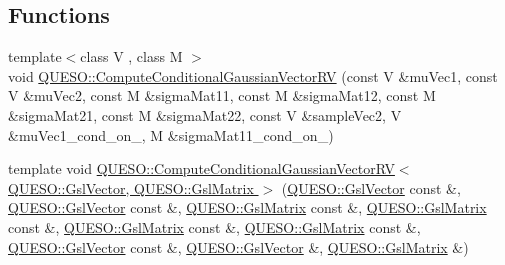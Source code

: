 \subsection*{Functions}
\begin{DoxyCompactItemize}
\item 
{\footnotesize template$<$class V , class M $>$ }\\void \hyperlink{namespace_q_u_e_s_o_ad6d1e060295dcebaf3253c342c2a8746}{Q\-U\-E\-S\-O\-::\-Compute\-Conditional\-Gaussian\-Vector\-R\-V} (const V \&mu\-Vec1, const V \&mu\-Vec2, const M \&sigma\-Mat11, const M \&sigma\-Mat12, const M \&sigma\-Mat21, const M \&sigma\-Mat22, const V \&sample\-Vec2, V \&mu\-Vec1\-\_\-cond\-\_\-on\-\_, M \&sigma\-Mat11\-\_\-cond\-\_\-on\-\_)
\item 
template void \hyperlink{_gaussian_vector_r_v_8_c_aef336afbfa12684a82e50d2efba7acc7}{Q\-U\-E\-S\-O\-::\-Compute\-Conditional\-Gaussian\-Vector\-R\-V$<$ Q\-U\-E\-S\-O\-::\-Gsl\-Vector, Q\-U\-E\-S\-O\-::\-Gsl\-Matrix $>$} (\hyperlink{class_q_u_e_s_o_1_1_gsl_vector}{Q\-U\-E\-S\-O\-::\-Gsl\-Vector} const \&, \hyperlink{class_q_u_e_s_o_1_1_gsl_vector}{Q\-U\-E\-S\-O\-::\-Gsl\-Vector} const \&, \hyperlink{class_q_u_e_s_o_1_1_gsl_matrix}{Q\-U\-E\-S\-O\-::\-Gsl\-Matrix} const \&, \hyperlink{class_q_u_e_s_o_1_1_gsl_matrix}{Q\-U\-E\-S\-O\-::\-Gsl\-Matrix} const \&, \hyperlink{class_q_u_e_s_o_1_1_gsl_matrix}{Q\-U\-E\-S\-O\-::\-Gsl\-Matrix} const \&, \hyperlink{class_q_u_e_s_o_1_1_gsl_matrix}{Q\-U\-E\-S\-O\-::\-Gsl\-Matrix} const \&, \hyperlink{class_q_u_e_s_o_1_1_gsl_vector}{Q\-U\-E\-S\-O\-::\-Gsl\-Vector} const \&, \hyperlink{class_q_u_e_s_o_1_1_gsl_vector}{Q\-U\-E\-S\-O\-::\-Gsl\-Vector} \&, \hyperlink{class_q_u_e_s_o_1_1_gsl_matrix}{Q\-U\-E\-S\-O\-::\-Gsl\-Matrix} \&)
\end{DoxyCompactItemize}



